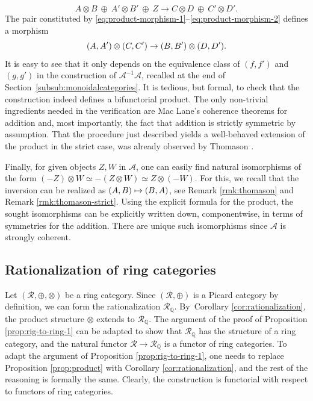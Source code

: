 \documentclass[11pt]{article}
\newcommand\mto{\mathchoice{\longmapsto}{\mapsto}{\mapsto}{\mapsto}}
\theoremstyle{plain}
\theoremstyle{definition}
\newcommand{\QBbb}{\mathbb Q}
\newcommand{\Acal}{\mathcal A}
\newcommand{\Rcal}{\mathcal R}
\begin{document}
\begin{equation}\label{eq:product-morphism-2}
A\otimes B\ \oplus\ A'\otimes B'\ \oplus\ Z\to C\otimes D\ \oplus\ C'\otimes D'.
\end{equation}
The pair constituted by \eqref{eq:product-morphism-1}--\eqref{eq:product-morphism-2} defines a morphism\vspace*{-3pt}
\[
(A,A')\otimes (C,C')\to (B,B')\otimes\nobreak (D,D').
\]
It is easy to see that it only depends on the equivalence class of $(f,f')$ and $(g,g')$ in the construction of $\Acal^{-1}\Acal$, recalled at the end of Section~\ref{subsub:monoidalcategories}. It is tedious, but formal, to check that the construction indeed defines a bifunctorial product. The only non-trivial ingredients needed in the verification are Mac Lane's coherence theorems for addition and, most importantly, the fact that addition is strictly symmetric by assumption. That the procedure just described yields a well-behaved extension of the product in the strict case, was already observed by Thomason \cite[p.\,572]{ThomasonPhony}.

Finally, for given objects $Z, W$ in $\Acal$, one can easily find natural isomorphisms of the form $(-Z)\otimes W\simeq -(Z\otimes W)\simeq Z\otimes (-W)$. For this, we recall that the inversion can be realized as $(A,B)\mto (B,A)$, see Remark \ref{rmk:thomason} and Remark \ref{rmk:thomason-strict}. Using the explicit formula for the product, the sought isomorphisms can be explicitly written down, componentwise, in terms of symmetries for the addition. There are unique such isomorphisms since $\Acal$ is strongly coherent.\enlargethispage{.5\baselineskip}%

\subsection{Rationalization of ring categories}\label{subsec:rationalization-ring-categories}
Let $(\Rcal,\oplus,\otimes)$ be a ring category. Since $(\Rcal,\oplus)$ is a Picard category by definition, we can form the rationalization $\Rcal_{\QBbb}$. By~Corollary \ref{cor:rationalization}, the product structure $\otimes$ extends to $\Rcal_{\QBbb}$. The argument of the proof of Proposition \ref{prop:rig-to-ring-1} can be adapted to show that $\Rcal_{\QBbb}$ has the structure of a ring category, and the natural functor $\Rcal\to\Rcal_{\QBbb}$ is a functor of ring categories. To adapt the argument of Proposition \ref{prop:rig-to-ring-1}, one needs to replace Proposition \ref{prop:product} with Corollary \ref{cor:rationalization}, and the rest of the reasoning is formally the same. Clearly, the construction is functorial with respect to functors of ring categories.
\end{document}
